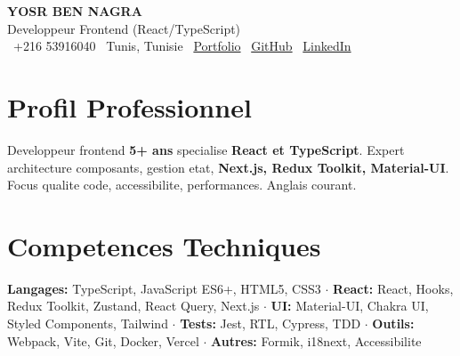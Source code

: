 \documentclass[10pt,a4paper]{article}
\begin{document}
\begin{center}
  {\Large\bfseries\color{primary} YOSR BEN NAGRA}\\[2pt]
  {\small\color{darkgray} Developpeur Frontend (React/TypeScript)}\\[3pt]
  {\footnotesize
    \faPhone\ +216 53916040 \quad
    \faMapMarker*\ Tunis, Tunisie \quad
    \faGlobe\ \href{https://portfolio-yosr.vercel.app/en}{Portfolio} \quad
    \faGithub\ \href{https://github.com/YosrBennagra}{GitHub} \quad
    \faLinkedin\ \href{https://www.linkedin.com/in/yosr-ben-nagra/}{LinkedIn}
  }
\end{center}

\section*{Profil Professionnel}
{\small
Developpeur frontend \textbf{5+ ans} specialise \textbf{React et TypeScript}. Expert architecture composants, gestion etat, \textbf{Next.js, Redux Toolkit, Material-UI}. Focus qualite code, accessibilite, performances. Anglais courant.
}

\vspace{6pt}

\section*{Competences Techniques}
{\small
\textbf{Langages:} TypeScript, JavaScript ES6+, HTML5, CSS3 $\cdot$ \textbf{React:} React, Hooks, Redux Toolkit, Zustand, React Query, Next.js $\cdot$ \textbf{UI:} Material-UI, Chakra UI, Styled Components, Tailwind $\cdot$ \textbf{Tests:} Jest, RTL, Cypress, TDD $\cdot$ \textbf{Outils:} Webpack, Vite, Git, Docker, Vercel $\cdot$ \textbf{Autres:} Formik, i18next, Accessibilite
}

\vspace{6pt}

\end{document}
